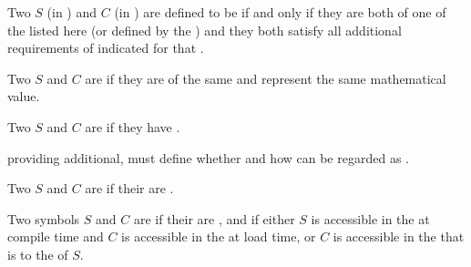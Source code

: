 % 
% 
% 
% 


Two  $S$ (in ) and $C$ (in )
     are defined to be  if and only if 
     they are both of one of the  listed here
      (or defined by the ) 
 and they both satisfy all additional requirements of  
      indicated for that .

\beginlist

 
Two  $S$ and $C$ are  if they are of the same 
and represent the same mathematical value.

 

Two   $S$ and $C$ are  
if they have   .

 providing additional,  
 must define whether and how   
can be regarded as .


Two   $S$ and $C$ are 
if their
are .

Two  symbols $S$ and $C$ are  
if their  are ,
and if either $S$ is accessible in the  at compile time
          and $C$ is accessible in the  at load time,
       or $C$ is accessible in the  that is  to
          the  of $S$.

